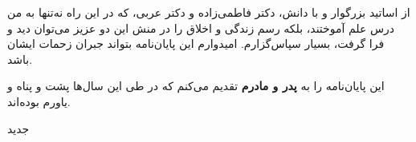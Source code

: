 


\begin{center}
\end{center}

از اساتید بزرگوار و با دانش، دکتر فاطمی‌زاده و دکتر عربی، که در این راه نه‌تنها به من درس علم آموختند، بلکه رسم زندگی و اخلاق را در منش این دو عزیز می‌توان دید و فرا گرفت، بسیار سپاس‌گزارم. امیدوارم این پایان‌نامه بتواند جبران زحمات ایشان باشد.

این پایان‌نامه را به \textbf{پدر و مادرم} تقدیم می‌کنم که در طی این سال‌ها پشت و پناه و یاورم بوده‌اند.

‌جدید
